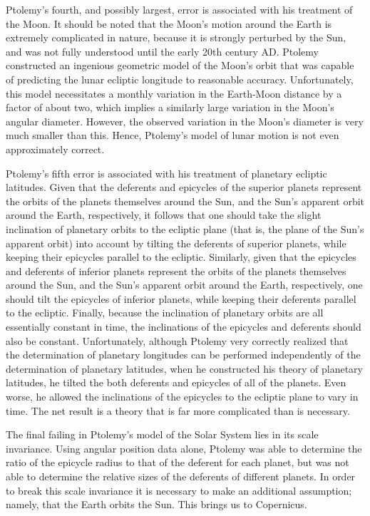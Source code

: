 Ptolemy's fourth, and possibly largest, error is associated with his treatment
of the Moon. It should be noted that the Moon's motion around the
Earth is extremely complicated in nature, because it is strongly perturbed by the Sun,  and was not fully understood until
the early 20th century AD. Ptolemy constructed an ingenious geometric
model of the Moon's orbit that was capable of predicting
the lunar ecliptic longitude to reasonable accuracy. Unfortunately, this
model necessitates a monthly variation in the Earth-Moon distance  by a factor of about two, 
which  implies a similarly large variation in the Moon's angular diameter. However, the observed variation in the   Moon's diameter is very much smaller than this. Hence, Ptolemy's model of lunar motion is not even approximately correct.

Ptolemy's fifth error is associated with his treatment of planetary
ecliptic latitudes. Given that the deferents and epicycles of
the superior planets represent the orbits of the planets themselves around the
Sun, and the Sun's apparent orbit around the Earth, respectively, it follows
that one should take the slight inclination of planetary orbits to
the ecliptic plane (that is, the plane of the Sun's apparent orbit)
into account by tilting the deferents of superior planets, while keeping their epicycles
parallel to the ecliptic. Similarly, given that the epicycles and deferents of
inferior planets represent the orbits of the planets themselves around the
Sun, and the Sun's apparent orbit around the Earth, respectively, one should tilt the epicycles of
inferior planets, while keeping their deferents parallel to the ecliptic. 
Finally, because the inclination of  planetary orbits are all essentially constant in time, the inclinations
of the epicycles and deferents should also be constant. 
Unfortunately, although Ptolemy very correctly realized that the determination of planetary longitudes can be performed independently of the determination of planetary
latitudes, when he constructed his theory of
planetary latitudes, he tilted  the both deferents and epicycles of
all of the planets. Even worse, he allowed the inclinations of the epicycles to
the ecliptic plane to vary in time. The net result is a theory that is far more
complicated than is necessary.

The final failing in Ptolemy's model of the Solar System lies in its  scale invariance. 
Using angular position data alone, Ptolemy was  able to determine the ratio 
of the epicycle radius to that of the deferent for each planet, but was
not able to determine the  relative sizes  of the deferents of different planets. 
In order to break this scale invariance it is necessary to make an
additional assumption; namely, that the Earth orbits the Sun. This
brings us to Copernicus.

